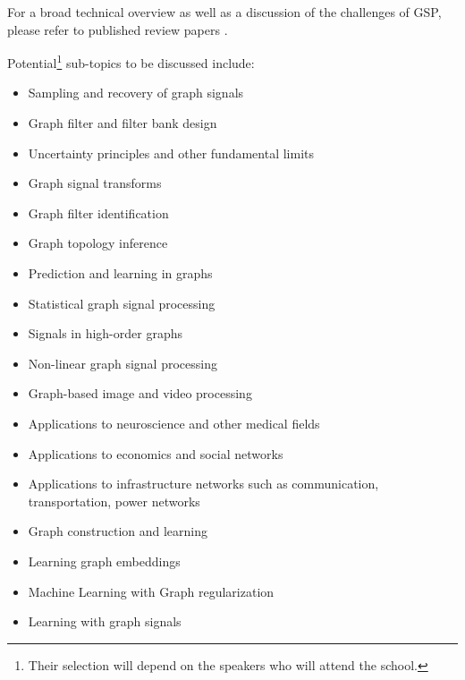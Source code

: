 \documentclass[a4paper]{scrartcl}
\begin{document}
For a broad technical overview as well as a discussion of the challenges of GSP,
please refer to published review papers \cite{shuman_emerging_2013,
sandryhaila_discrete_2014, coifman_diffusion_2006, ekambaram_circulant_2013}.

Potential\footnote{Their selection will depend on the speakers who will attend
the school.} sub-topics to be discussed include:
\begin{itemize}
	\setlength{\itemsep}{0pt} \setlength{\parskip}{0pt}
	\item Sampling and recovery of graph signals
	\item Graph filter and filter bank design
	\item Uncertainty principles and other fundamental limits
	\item Graph signal transforms
	\item Graph filter identification
	\item Graph topology inference
	\item Prediction and learning in graphs
	\item Statistical graph signal processing
	\item Signals in high-order graphs
	\item Non-linear graph signal processing
	\item Graph-based image and video processing
	\item Applications to neuroscience and other medical fields
	\item Applications to economics and social networks
	\item Applications to infrastructure networks such as communication, transportation, power networks 
	\item Graph construction and learning
	\item Learning graph embeddings
	\item Machine Learning with Graph regularization
	\item Learning with graph signals
\end{itemize}
\end{document}
